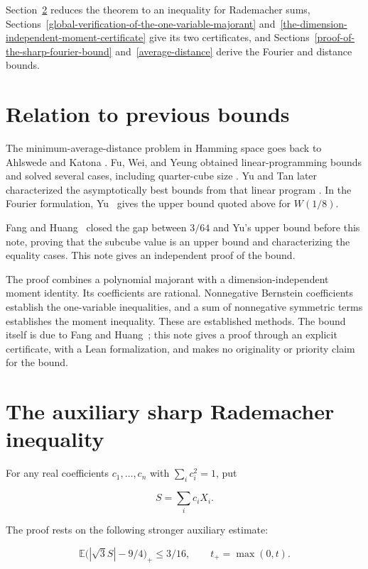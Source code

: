 \documentclass[11pt]{article}
\begin{document}
Section~\ref{the-auxiliary-sharp-rademacher-inequality} reduces the
theorem to an inequality for Rademacher sums,
Sections~\ref{global-verification-of-the-one-variable-majorant}
and~\ref{the-dimension-independent-moment-certificate} give its two
certificates, and
Sections~\ref{proof-of-the-sharp-fourier-bound}
and~\ref{average-distance} derive the Fourier and distance bounds.

\section{Relation to previous bounds}\label{sec:prior}

The minimum-average-distance problem in Hamming space goes back to Ahlswede and Katona \cite{AK77}. Fu, Wei, and Yeung obtained linear-programming bounds and solved several cases, including quarter-cube size \cite{FWY01}. Yu and Tan later characterized the asymptotically best bounds from that linear program \cite{YT19}. In the Fourier formulation, Yu~\cite{Y26} gives the upper bound quoted above for \(W(1/8)\).

Fang and Huang~\cite{FH26} closed the gap between \(3/64\) and Yu's upper bound before this note, proving that the subcube value is an upper bound and characterizing the equality cases. This note gives an independent proof of the bound.

The proof combines a polynomial majorant with a dimension-independent moment identity. Its coefficients are rational. Nonnegative Bernstein coefficients establish the one-variable inequalities, and a sum of nonnegative symmetric terms establishes the moment inequality. These are established methods. The bound itself is due to Fang and Huang~\cite{FH26}; this note gives a proof through an explicit certificate, with a Lean formalization, and makes no originality or priority claim for the bound.

\section{The auxiliary sharp Rademacher inequality}\label{the-auxiliary-sharp-rademacher-inequality}

For any real coefficients \(c_1,\ldots,c_n\) with \(\sum_i c_i^2=1\),
put

\[S=\sum_i c_iX_i.\]

The proof rests on the following stronger auxiliary estimate:

\[\mathbb E\bigl(|\sqrt3 S|-9/4\bigr)_+\le3/16,\qquad t_+=\max(0,t). \tag{3}\]
\end{document}
